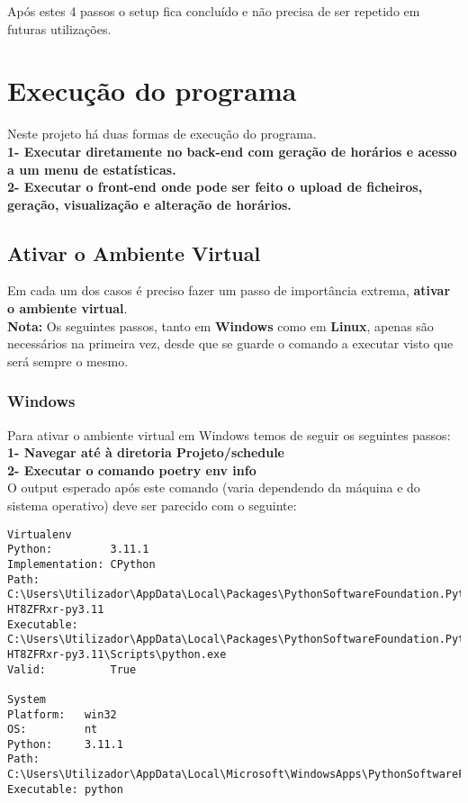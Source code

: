 \documentclass[11pt,a4paper]{report}
\begin{document}
Após estes 4 passos o setup fica concluído e não precisa de ser repetido em futuras utilizações. 

 
\chapter{Execução do programa}

Neste projeto há duas formas de execução do programa. \\ 

\textbf{1- Executar diretamente no back-end com geração de horários e acesso a um menu de estatísticas.} \\

\textbf{2- Executar o front-end onde pode ser feito o upload de ficheiros, geração, visualização e alteração de horários.} \\



\section{Ativar o Ambiente Virtual}
Em cada um dos casos é preciso fazer um passo de importância extrema, \textbf{ativar o ambiente virtual}. \\

\textbf{Nota: } Os seguintes passos, tanto em \textbf{Windows} como em \textbf{Linux}, apenas são necessários na primeira vez, desde que se guarde o comando a executar visto que será sempre o mesmo.

\subsection{Windows}
Para ativar o ambiente virtual em Windows temos de seguir os seguintes passos: \\

\textbf{1- Navegar até à diretoria Projeto/schedule}\\ 

\textbf{2- Executar o comando poetry env info}\\

O output esperado após este comando (varia dependendo da máquina e do sistema operativo) deve ser parecido com o seguinte:  \\

\begin{verbatim}
Virtualenv
Python:         3.11.1
Implementation: CPython
Path:           C:\Users\Utilizador\AppData\Local\Packages\PythonSoftwareFoundation.Python.3.11_qbz5n2kfra8p0\LocalCache\Local\pypoetry\Cache\virtualenvs\schedule-HT8ZFRxr-py3.11
Executable:     C:\Users\Utilizador\AppData\Local\Packages\PythonSoftwareFoundation.Python.3.11_qbz5n2kfra8p0\LocalCache\Local\pypoetry\Cache\virtualenvs\schedule-HT8ZFRxr-py3.11\Scripts\python.exe
Valid:          True

System
Platform:   win32
OS:         nt
Python:     3.11.1
Path:       C:\Users\Utilizador\AppData\Local\Microsoft\WindowsApps\PythonSoftwareFoundation.Python.3.11_3.11.496.0_x64__qbz5n2kfra8p0
Executable: python
\end{verbatim} \\ 
\end{document}
